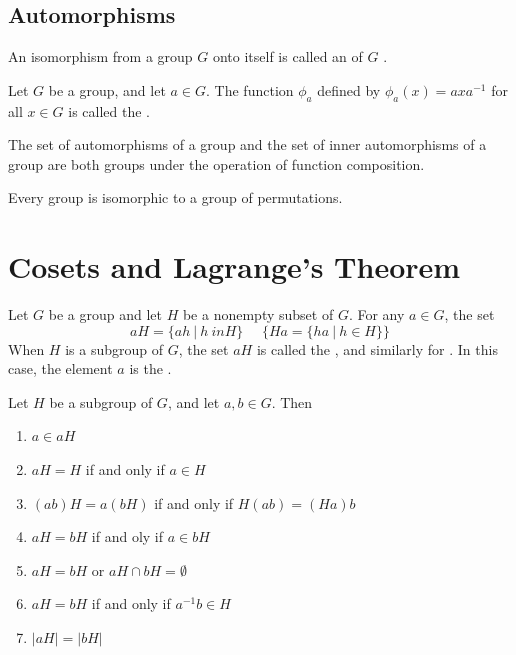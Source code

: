 \documentclass[12pt]{scrartcl}
\begin{document}
\subsection{Automorphisms}

\begin{definition}
  An isomorphism from a group $G$ onto itself is called an  of $G$ .
\end{definition}

\begin{definition}
  Let $G$ be a group, and let $a \in G$. The function $\phi_a$ defined by $\phi_a(x) = axa^{-1}$ for all $x \in G$ is called the .
\end{definition}

\begin{theorem}
  The set of automorphisms of a group and the set of inner automorphisms of a group are both groups under the operation of function composition.
\end{theorem}

\begin{theorem}
  Every group is isomorphic to a group of permutations. 
\end{theorem}

\section{Cosets and Lagrange's Theorem}

\begin{definition}
  Let $G$ be a group and let $H$ be a nonempty subset of $G$. For any $a \in G$, the set 
  \[aH = \{ah \ | \ h \ in H\} \ \ \ \ \ \ \{Ha = \{ha \ | \ h \in H\}\}\]
  When $H$ is a subgroup of $G$, the set $aH$ is called the , and similarly for 
  . In this case, the element $a$ is the . 
\end{definition}

\begin{lemma}
  Let $H$ be a subgroup of $G$, and let $a, b \in G$. Then 
  \begin{enumerate}
    \item $a \in aH$ 
    \item $aH = H$ if and only if $a \in H$
    \item $(ab)H = a(bH)$ if and only if $H(ab) = (Ha)b$
    \item $aH = bH$ if and oly if $a \in bH$
    \item $aH = bH$ or $aH \cap bH = \emptyset$
    \item $aH = bH$ if and only if $a^{-1}b \in H$
    \item $|aH| = |bH|$
  \end{enumerate}
\end{lemma}
\end{document}
